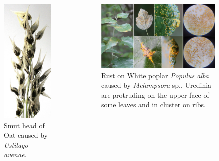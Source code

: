 \documentclass[10pt,dvipsnames,ignorenonframetext,aspectratio=169]{beamer}
\begin{document}
\begin{frame}{}
\protect\hypertarget{section-10}{}
\begin{columns}[T, onlytextwidth]

\begin{figure}
\includegraphics[width=0.45\linewidth]{../images/ustilago_avenae} \caption{Smut head of Oat caused by \textit{Ustilago avenae}.}\label{fig:avenae-smut}
\end{figure}


\begin{figure}
\includegraphics[width=0.95\linewidth]{../images/FdhD0Z3XoAIf1OB} \caption{Rust on White poplar \textit{Populus alba} caused by \textit{Melampsora} sp.. Uredinia are protruding on the upper face of some leaves and in cluster on ribs.}\label{fig:poplar-rust}
\end{figure}

\end{columns}
\end{frame}
\end{document}
